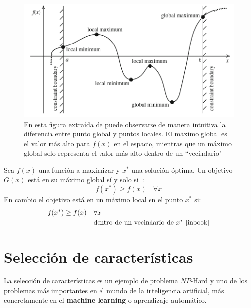 \begin{figure}[H]
    \begin{center}
        \includegraphics[width=1\textwidth]{imagenes/min-max_points.png}
    \end{center}
    \caption[Puntos globales y locales]{En esta figura extraída de \cite{inbook} puede observarse de manera intuitiva la diferencia entre punto global y puntos locales. El máximo global es el valor más alto para $f(x)$ en el espacio, mientras que un máximo global solo representa el valor más alto dentro de un ``vecindario"}
\end{figure}

Sea $f(x)$ una función a maximizar y $x^*$ una solución óptima. Un objetivo $G(x)$ está en su máximo global sí y solo si~\cite{inbook}:
\begin{equation}
    f(x^*) \geq f(x) \quad \forall x
\end{equation}
En cambio el objetivo está en un máximo local en el punto $x^*$ si:
\begin{equation}
    \begin{split}
        f(x^*) \geq f(x) \quad & \forall x \\
        & \text{dentro de un vecindario de } x^*\text{~\cite{inbook}}
    \end{split}
\end{equation}

\section{Selección de características}
La selección de características es un ejemplo de problema $NP$-Hard y uno de los problemas más importantes en el mundo de la inteligencia artificial, más concretamente en el \textbf{machine learning} o aprendizaje automático.

